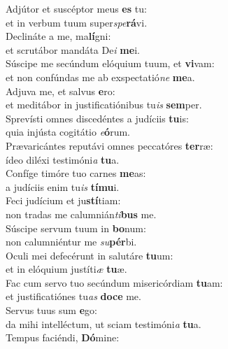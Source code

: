 \evenverse Adjútor et suscéptor meus \textbf{es} tu:~\*\\
\evenverse et in verbum tuum super\textit{spe}\textbf{rá}vi.\\
\oddverse Declináte a me, ma\textbf{lí}gni:~\*\\
\oddverse et scrutábor mandáta De\textit{i} \textbf{me}i.\\
\evenverse Súscipe me secúndum elóquium tuum, et \textbf{vi}vam:~\*\\
\evenverse et non confúndas me ab exspectatió\textit{ne} \textbf{me}a.\\
\oddverse Adjuva me, et salvus \textbf{e}ro:~\*\\
\oddverse et meditábor in justificatiónibus tu\textit{is} \textbf{sem}per.\\
\evenverse Sprevísti omnes discedéntes a judíciis \textbf{tu}is:~\*\\
\evenverse quia injústa cogitátio \textit{e}\textbf{ó}rum.\\
\oddverse Prævaricántes reputávi omnes peccatóres \textbf{ter}ræ:~\*\\
\oddverse ídeo diléxi testimóni\textit{a} \textbf{tu}a.\\
\evenverse Confíge timóre tuo carnes \textbf{me}as:~\*\\
\evenverse a judíciis enim tu\textit{is} \textbf{tí}\textbf{mu}i.\\
\oddverse Feci judícium et ju\textbf{stí}tiam:~\*\\
\oddverse non tradas me calumnián\textit{ti}\textbf{bus} me.\\
\evenverse Súscipe servum tuum in \textbf{bo}num:~\*\\
\evenverse non calumniéntur me \textit{su}\textbf{pér}bi.\\
\oddverse Oculi mei defecérunt in salutáre \textbf{tu}um:~\*\\
\oddverse et in elóquium justíti\textit{æ} \textbf{tu}æ.\\
\evenverse Fac cum servo tuo secúndum misericórdiam \textbf{tu}am:~\*\\
\evenverse et justificatiónes tu\textit{as} \textbf{do}\textbf{ce} me.\\
\oddverse Servus tuus sum \textbf{e}go:~\*\\
\oddverse da mihi intelléctum, ut sciam testimóni\textit{a} \textbf{tu}a.\\
\evenverse Tempus faciéndi, \textbf{Dó}mine:~\*\\

